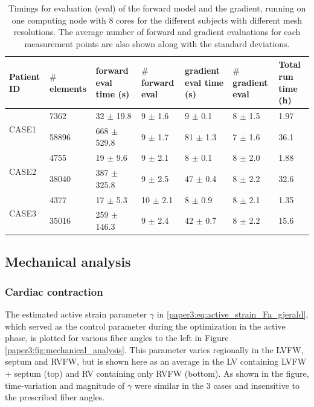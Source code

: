 \begin{table}
\caption{Timings for evaluation (eval) of the forward model and the gradient,
  running on one computing node with 8 cores for the different subjects
  with different mesh resolutions. The average number of forward
 and gradient evaluations for each measurement points are also shown
 along with the standard deviations.}
\begin{tabular}{lllllll}
\toprule
  Patient ID   & $\#$ elements   & forward eval time (s)
  & $\#$ forward eval   & gradient eval time (s)
  & $\#$ gradient eval & Total run time (h)  \\
  \midrule
  \multirow{2}{*}{CASE1}
               &7362  & 32 $\pm$ 19.8   & 9 $\pm$ 1.6  & 9 $\pm$ 0.1  & 8 $\pm$ 1.5 & 1.97\\
               &58896 & 668 $\pm$ 529.8 & 9 $\pm$ 1.7  & 81 $\pm$ 1.3 & 7 $\pm$ 1.6 & 36.1\\
  \hline
  \multirow{2}{*}{CASE2}
               & 4755  & 19 $\pm$ 9.6    & 9 $\pm$ 2.1  & 8 $\pm$ 0.1  & 8 $\pm$ 2.0 & 1.88\\
               & 38040 & 387 $\pm$ 325.8 & 9 $\pm$ 2.5  & 47 $\pm$ 0.4 & 8 $\pm$ 2.2 & 32.6\\
  \hline
  \multirow{2}{*}{CASE3}
               & 4377  & 17 $\pm$ 5.3    & 10 $\pm$ 2.1 & 8 $\pm$ 0.9  & 8 $\pm$ 2.1 & 1.35\\
               & 35016 & 259 $\pm$ 146.3 & 9 $\pm$ 2.4  & 42 $\pm$ 0.7 & 8 $\pm$ 2.2 & 15.6\\
\bottomrule
\end{tabular}
\label{paper3:tab:timings}
\end{table}



\subsection{Mechanical analysis}
\label{paper3:sec:mech_analysis}
\subsubsection{Cardiac contraction}
The estimated active strain parameter $\gamma$ in
\eqref{paper3:eq:active_strain_Fa_gjerald}, which served as the control parameter
during the optimization in the  active phase, is plotted for various fiber angles to the
left in Figure \ref{paper3:fig:mechanical_analysis}. This parameter
varies regionally in the LVFW, septum and RVFW, but is shown here as
an average in the LV containing LVFW + septum (top) and RV containing
only RVFW (bottom). As shown in the figure, time-variation and
magnitude of $\gamma$ were similar in the 3 cases and insensitive to
the prescribed fiber angles. 

